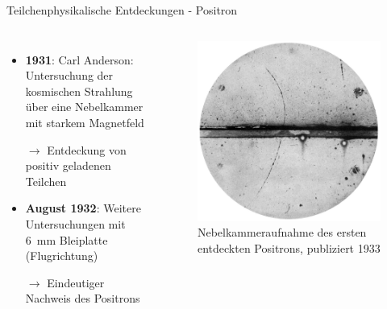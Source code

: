\documentclass[aspectratio=1610, professionalfonts, 9pt, hyperref={colorlinks=false}]{beamer}
\begin{document}
\begin{frame}{Teilchenphysikalische Entdeckungen - Positron}
  \begin{columns}
      \begin{itemize}
        \setlength\itemsep{0.5em}
        \item \textbf{1931}: Carl Anderson: Untersuchung der kosmischen Strahlung über eine Nebelkammer mit starkem Magnetfeld
        \item[$\rightarrow$] Entdeckung von positiv geladenen Teilchen
        \item \textbf{August 1932}: Weitere Untersuchungen mit \SI{6}{\milli\meter} Bleiplatte (Flugrichtung)
        \item[$\rightarrow$] Eindeutiger Nachweis des Positrons

      \end{itemize}
        \vspace*{10px}
  
      \begin{figure}
          \centering
          \includegraphics[width=0.7\linewidth]{images/positron.jpg}
          \caption{Nebelkammeraufnahme des ersten entdeckten Positrons, publiziert 1933 \cite{positron}}
      \end{figure}
  \end{columns}
\end{frame}
\end{document}

